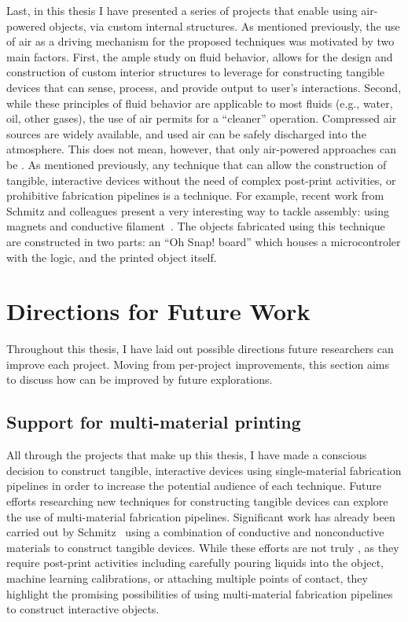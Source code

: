     Last, in this thesis I have presented a series of projects that enable \papf
    using air-powered objects, via custom internal structures. As mentioned
    previously, the use of air as a driving mechanism for the proposed
    techniques was motivated by two main factors. First, the ample study on
    fluid behavior, allows for the design and construction of custom interior
    structures to leverage  for constructing
    tangible devices that can sense, process, and provide output to user's
    interactions. Second, while these principles of fluid behavior are
    applicable to most fluids (e.g., water, oil, other gases), the use of air
    permits for a ``cleaner'' operation. Compressed air sources are widely
    available, and used air can be safely discharged into the atmosphere. This
    does not mean, however, that only air-powered approaches can be \pap.  As
    mentioned previously, any technique that can allow the construction of
    tangible, interactive devices without the need of complex post-print
    activities, or prohibitive fabrication pipelines is a \papf technique. For
    example, recent work from Schmitz and colleagues present a very interesting
    way to tackle assembly: using magnets and conductive
    filament~\cite{Schmitz:2021}. The objects fabricated using this technique
    are constructed in two parts: an ``Oh Snap!  board'' which houses a
    microcontroler with the logic, and the printed object itself.

  \section{Directions for Future Work}
    Throughout this thesis, I have laid out possible directions future
    researchers can improve each project. Moving from per-project improvements,
    this section aims to discuss how \papf can be improved by future
    explorations.

    \subsection{Support for multi-material printing}
      All through the projects that make up this thesis, I have made a conscious
      decision to construct tangible, interactive devices using single-material
      fabrication pipelines in order to increase the potential audience of each
      technique. Future efforts researching new \pap techniques for constructing
      tangible devices can explore the use of multi-material fabrication
      pipelines. Significant work has already been carried out by
      Schmitz~\cite{Schmitz:2019a} using a combination of conductive and
      nonconductive materials to construct tangible devices. While these efforts
      are not truly \pap, as they require post-print activities including
      carefully pouring liquids into the object, machine learning
      calibrations, or attaching multiple points of contact, they highlight the
      promising possibilities of using multi-material fabrication pipelines to
      construct interactive objects.

